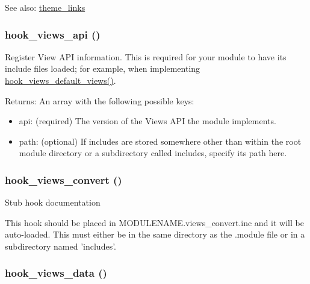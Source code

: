 \begin{Desc}
\item[See also:]\hyperlink{group__themeable_g6a23e012993ee8a2494249148d15d2bf}{theme\_\-links} \end{Desc}
\hypertarget{group__views__hooks_gc67ffd4a2f61f9814ee37b541c472c47}{
\subsubsection[{hook\_\-views\_\-api}]{\setlength{\rightskip}{0pt plus 5cm}hook\_\-views\_\-api ()}}
\label{group__views__hooks_gc67ffd4a2f61f9814ee37b541c472c47}


Register View API information. This is required for your module to have its include files loaded; for example, when implementing \hyperlink{group__views__hooks_g23edb74860682fa88f75cf94b97c2e15}{hook\_\-views\_\-default\_\-views()}.

\begin{Desc}
\item[Returns:]An array with the following possible keys:\begin{itemize}
\item api: (required) The version of the Views API the module implements.\item path: (optional) If includes are stored somewhere other than within the root module directory or a subdirectory called includes, specify its path here. \end{itemize}
\end{Desc}
\hypertarget{group__views__hooks_ge98b0a1c700fe1406af390dfc8c7262e}{
\subsubsection[{hook\_\-views\_\-convert}]{\setlength{\rightskip}{0pt plus 5cm}hook\_\-views\_\-convert ()}}
\label{group__views__hooks_ge98b0a1c700fe1406af390dfc8c7262e}


Stub hook documentation

This hook should be placed in MODULENAME.views\_\-convert.inc and it will be auto-loaded. This must either be in the same directory as the .module file or in a subdirectory named 'includes'. \hypertarget{group__views__hooks_g227057901681e4a33e33c199c7a8c989}{
\subsubsection[{hook\_\-views\_\-data}]{\setlength{\rightskip}{0pt plus 5cm}hook\_\-views\_\-data ()}}
\label{group__views__hooks_g227057901681e4a33e33c199c7a8c989}


